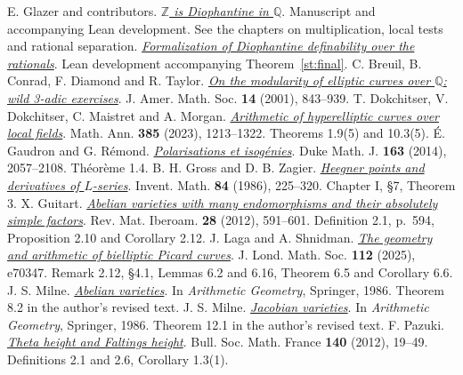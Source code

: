 \documentclass[10pt,a4paper]{article}
\newcommand{\Q}{\mathbb Q}\newcommand{\Z}{\mathbb Z}\newcommand{\N}{\mathbb N}\newcommand{\C}{\mathbb C}
\newcommand{\paperlink}[2]{\href{#1}{\textit{#2}}}
\begin{document}
\clearpage
{}
{}
\begin{thebibliography}{99}
 E. Glazer and contributors.
\paperlink{https://github.com/elliotglazer/diophantine-z-q/tree/2358394558aafae202a1ce6d3bd1b536b79ad3d0}{\(\Z\) is Diophantine in \(\Q\)}. Manuscript and accompanying Lean development. See the chapters on multiplication, local tests and rational separation.
 \paperlink{https://github.com/nasqret/z-in-q-lean/tree/95357929cf16cedd3dd1960c11060cb923f5bdca}{Formalization of Diophantine definability over the rationals}. Lean development accompanying Theorem~\hyperref[st:final]{\ref*{st:final}}.
 C. Breuil, B. Conrad, F. Diamond and R. Taylor.
\paperlink{https://math.stanford.edu/~conrad/papers/tswfinal.pdf}{On the modularity of elliptic curves over \(\Q\): wild 3-adic exercises}. J. Amer. Math. Soc. \textbf{14} (2001), 843--939.
 T. Dokchitser, V. Dokchitser, C. Maistret and A. Morgan.
\paperlink{https://doi.org/10.1007/s00208-021-02319-y}{Arithmetic of hyperelliptic curves over local fields}. Math. Ann. \textbf{385} (2023), 1213--1322. Theorems 1.9(5) and 10.3(5).
 É. Gaudron and G. Rémond. \paperlink{https://lmbp.uca.fr/~gaudron/art13.pdf}{Polarisations et isogénies}. Duke Math. J. \textbf{163} (2014), 2057--2108. Théorème 1.4.
 B. H. Gross and D. B. Zagier.
\paperlink{https://doi.org/10.1007/BF01388809}{Heegner points and derivatives of \(L\)-series}. Invent. Math. \textbf{84} (1986), 225--320. Chapter I, §7, Theorem 3.
 X. Guitart. \paperlink{https://doi.org/10.4171/RMI/686}{Abelian varieties with many endomorphisms and their absolutely simple factors}. Rev. Mat. Iberoam. \textbf{28} (2012), 591--601. Definition 2.1, p.~594, Proposition 2.10 and Corollary 2.12.
 J. Laga and A. Shnidman. \paperlink{https://doi.org/10.1112/jlms.70347}{The geometry and arithmetic of bielliptic Picard curves}. J. Lond. Math. Soc. \textbf{112} (2025), e70347. Remark 2.12, §4.1, Lemmas 6.2 and 6.16, Theorem 6.5 and Corollary 6.6.
 J. S. Milne. \paperlink{https://www.jmilne.org/math/xnotes/AVs.pdf}{Abelian varieties}. In \emph{Arithmetic Geometry}, Springer, 1986. Theorem 8.2 in the author's revised text.
 J. S. Milne. \paperlink{https://www.jmilne.org/math/xnotes/JVs.pdf}{Jacobian varieties}. In \emph{Arithmetic Geometry}, Springer, 1986. Theorem 12.1 in the author's revised text.
 F. Pazuki. \paperlink{https://doi.org/10.24033/bsmf.2623}{Theta height and Faltings height}. Bull. Soc. Math. France \textbf{140} (2012), 19--49. Definitions 2.1 and 2.6, Corollary 1.3(1).

\end{thebibliography}
\end{document}
